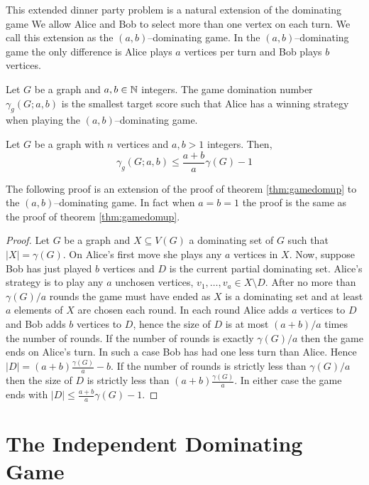 This extended dinner party problem is a natural extension of the dominating game We allow Alice and Bob to select more than one vertex on each turn. We call this extension as the $(a,b)$--dominating game. In the $(a,b)$--dominating game the only difference is Alice plays $a$ vertices per turn and Bob plays $b$ vertices.

\begin{definition}
    Let $G$ be a graph and $a,b\in\mathbb{N}$ integers. The game domination number $\gamma_g(G;a,b)$ is the smallest target score such that Alice has a winning strategy when playing the $(a,b)$--dominating game.
\end{definition}

\begin{theorem}[Askes] 
    Let $G$ be a graph with $n$ vertices and $a,b>1$ integers. Then,
    \[\gamma_{g}(G;a,b) \leq \frac{a+b}{a}\gamma(G) - 1\]
\end{theorem}
    The following proof is an extension of the proof of theorem \ref{thm:gamedomup} to the $(a,b)$--dominating game. In fact when $a=b=1$ the proof is the same as the proof of theorem \ref{thm:gamedomup}.
\begin{proof}    
   Let $G$ be a graph and $X\subseteq V(G)$ a dominating set of $G$ such that $|X| = \gamma(G)$. On Alice's first move she plays any $a$ vertices in $X$. Now, suppose Bob has just played $b$ vertices and $D$ is the current partial dominating set. Alice's strategy is to play any $a$ unchosen vertices, $v_1,\dots,v_a \in X\setminus D$. After no more than $\gamma(G)/a$ rounds the game must have ended as $X$ is a dominating set and at least $a$ elements of $X$ are chosen each round. In each round Alice adds $a$ vertices to $D$ and Bob adds $b$ vertices to $D$, hence the size of $D$ is at most $(a+b)/a$ times the number of rounds. If the number of rounds is exactly $\gamma(G)/a$ then the game ends on Alice's turn. In such a case Bob has had one less turn than Alice. Hence $|D|=(a+b)\frac{\gamma(G)}{a} -b$. If the number of rounds is strictly less than $\gamma(G)/a$ then the size of $D$ is strictly less than $(a+b)\frac{\gamma(G)}{a}$. In either case the game ends with $|D| \leq \frac{a+b}{a}\gamma(G) - 1$.
\end{proof}

\section{The Independent Dominating Game}

